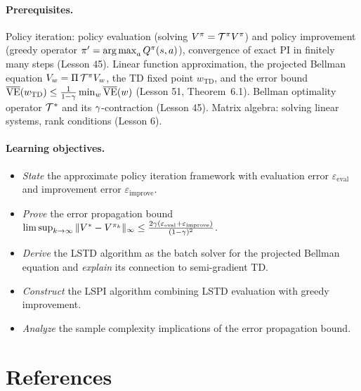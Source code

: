 \documentclass[11pt,a4paper]{article}
\begin{document}
\paragraph{Prerequisites.}
Policy iteration: policy evaluation (solving
$V^\pi = \mathcal{T}^\pi V^\pi$) and policy improvement
(greedy operator $\pi' = \operatorname{arg\,max}_a Q^\pi(s,a)$), convergence
of exact PI in finitely many steps (Lesson 45). Linear function
approximation, the projected Bellman equation
$V_w = \Pi\,\mathcal{T}^\pi V_w$, the TD fixed point $w_{\mathrm{TD}}$,
and the error bound
$\overline{\mathrm{VE}}(w_{\mathrm{TD}}) \leq
\frac{1}{1-\gamma}\min_w \overline{\mathrm{VE}}(w)$ (Lesson 51,
Theorem~6.1). Bellman optimality operator $\mathcal{T}^*$ and its
$\gamma$-contraction (Lesson 45). Matrix algebra: solving linear
systems, rank conditions (Lesson 6).

\paragraph{Learning objectives.}
\begin{itemize}
  \item \emph{State} the approximate policy iteration framework with
    evaluation error $\varepsilon_{\mathrm{eval}}$ and improvement
    error $\varepsilon_{\mathrm{improve}}$.
  \item \emph{Prove} the error propagation bound
    $\limsup_{k \to \infty} \|V^* - V^{\pi_k}\|_\infty
    \leq \frac{2\gamma(\varepsilon_{\mathrm{eval}}
    + \varepsilon_{\mathrm{improve}})}{(1-\gamma)^2}$.
  \item \emph{Derive} the LSTD algorithm as the batch solver for
    the projected Bellman equation and \emph{explain} its connection
    to semi-gradient TD.
  \item \emph{Construct} the LSPI algorithm combining LSTD evaluation
    with greedy improvement.
  \item \emph{Analyze} the sample complexity implications of the error
    propagation bound.
\end{itemize}

\section{References}
\label{sec:references}
\end{document}
